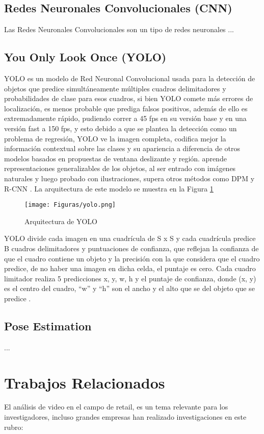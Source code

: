 \documentclass[conference]{IEEEtran}
\begin{document}
\subsection{Redes Neuronales Convolucionales (CNN)}
Las Redes Neuronales Convolucionales son un tipo de redes neuronales ...

\subsection{You Only Look Once (YOLO)}

YOLO es un modelo de Red Neuronal Convolucional usada para la detección de objetos que predice simultáneamente múltiples cuadros delimitadores y probabilidades de clase para esos cuadros, si bien YOLO comete más errores de localización, es menos probable que prediga falsos positivos, además de ello es extremadamente rápido, pudiendo correr a 45 fps en su versión base y en una versión fast a 150 fps, y esto debido a que se plantea la detección como un problema de regresión, YOLO ve la imagen completa, codifica mejor la información contextual sobre las clases y su apariencia a diferencia de otros modelos basados en propuestas de ventana deslizante y región. aprende representaciones generalizables de los objetos, al ser entrado con imágenes naturales y luego probado con ilustraciones, supera otros métodos como DPM y R-CNN \cite{redmon2018yolov3}. La arquitectura de este modelo se muestra en la Figura \ref{fig:yolo}

\begin{figure}[hbtp]
\centering
\texttt{[image: Figuras/yolo.png]}
\caption{Arquitectura de YOLO}
\label{fig:yolo}
\end{figure}

YOLO divide cada imagen en una cuadrícula de S x S y cada cuadrícula predice B cuadros delimitadores y puntuaciones de confianza, que reflejan la confianza de que el cuadro contiene un objeto y la precisión con la que considera que el cuadro predice, de no haber una imagen en dicha celda, el puntaje es cero. Cada cuadro limitador realiza 5 predicciones x, y, w, h y el puntaje de confianza, donde (x, y) es el centro del cuadro, “w” y “h” son el ancho y el alto que se del objeto que se predice \cite{redmon2018yolov3}.


\subsection{Pose Estimation}
...

\section{Trabajos Relacionados}
El análisis de video en el campo de retail, es un tema relevante para los investigadores, incluso grandes  empresas han realizado investigaciones en este rubro:
\end{document}
